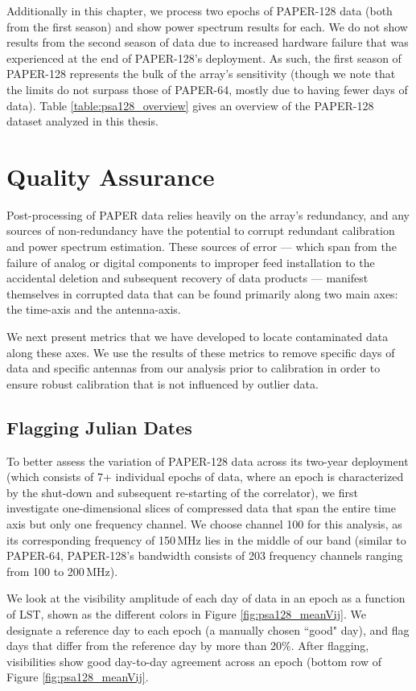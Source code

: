 Additionally in this chapter, we process two epochs of PAPER-128 data (both from the first season) and show power spectrum results for each. We do not show results from the second season of data due to increased hardware failure that was experienced at the end of PAPER-128's deployment. As such, the first season of PAPER-128 represents the bulk of the array's sensitivity (though we note that the limits do not surpass those of PAPER-64, mostly due to having fewer days of data). Table \ref{table:psa128_overview} gives an overview of the PAPER-128 dataset analyzed in this thesis.

\section{Quality Assurance}

Post-processing of PAPER data relies heavily on the array's redundancy, and any sources of non-redundancy have the potential to corrupt redundant calibration and power spectrum estimation. These sources of error --- which span from the failure of analog or digital components to improper feed installation to the accidental deletion and subsequent recovery of data products --- manifest themselves in corrupted data that can be found primarily along two main axes: the time-axis and the antenna-axis. 

We next present metrics that we have developed to locate contaminated data along these axes. We use the results of these metrics to remove specific days of data and specific antennas from our analysis prior to calibration in order to ensure robust calibration that is not influenced by outlier data.

\subsection{Flagging Julian Dates}

To better assess the variation of PAPER-128 data across its two-year deployment (which consists of 7+ individual epochs of data, where an epoch is characterized by the shut-down and subsequent re-starting of the correlator), we first investigate one-dimensional slices of compressed data that span the entire time axis but only one frequency channel. We choose channel 100 for this analysis, as its corresponding frequency of 150\,MHz lies in the middle of our band (similar to PAPER-64, PAPER-128's bandwidth consists of 203 frequency channels ranging from 100 to 200\,MHz).

We look at the visibility amplitude of each day of data in an epoch as a function of LST, shown as the different colors in Figure \ref{fig:psa128_meanVij}. We designate a reference day to each epoch (a manually chosen ``good" day), and flag days that differ from the reference day by more than 20\%. After flagging, visibilities show good day-to-day agreement across an epoch (bottom row of Figure \ref{fig:psa128_meanVij}.

